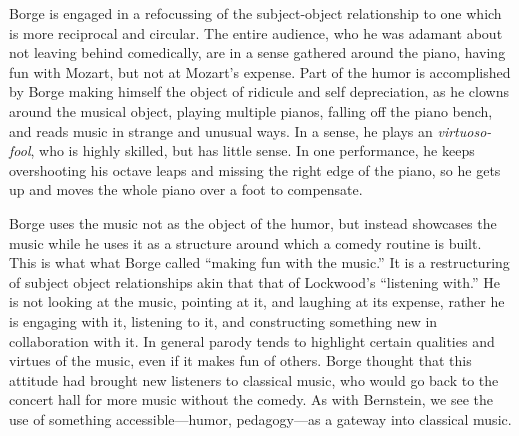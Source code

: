 \documentclass[12pt,letterpaper]{article}
\begin{document}
 	Borge is engaged in a refocussing of the subject-object 
	relationship to one which is more reciprocal and circular. The entire 
	audience, who he was adamant about not leaving behind comedically, are
	in a sense gathered around the piano, having fun with Mozart, but not at
	Mozart's expense. Part of the humor is accomplished by Borge making 
	himself
	the object of ridicule and self depreciation, as he clowns around the
	musical object, playing multiple pianos, falling off the piano bench,
	and reads music in strange and unusual ways. In a sense, he plays an
	\textit{virtuoso-fool}, who is highly skilled, but has little sense. 
	In one performance, he keeps overshooting his octave leaps and missing
	the right edge of the piano, so he gets up and moves the whole piano
	over a foot to compensate. 

	Borge uses the music not as the object of the humor, but instead
	showcases the music while he uses it as a structure
	around which a comedy routine is built. 
	This is what what Borge called ``making fun with the music.'' It is a 
	restructuring
	of subject object relationships akin that that of Lockwood's ``listening
	with.'' He is not looking at the music, pointing at it, and laughing at
	its expense, rather he is engaging with it, listening to it, and 
	constructing something new in collaboration with it. In general parody 
	tends to highlight certain qualities and virtues of the music, even if 
	it makes fun of others. Borge thought that this attitude had brought
	new listeners to classical music, who would go back to the concert hall 
	for more music without the comedy.\autocite[256]{Garrett} As with 
	Bernstein, we see the use of something accessible---humor,
	pedagogy---as a gateway into classical music.
\end{document}
